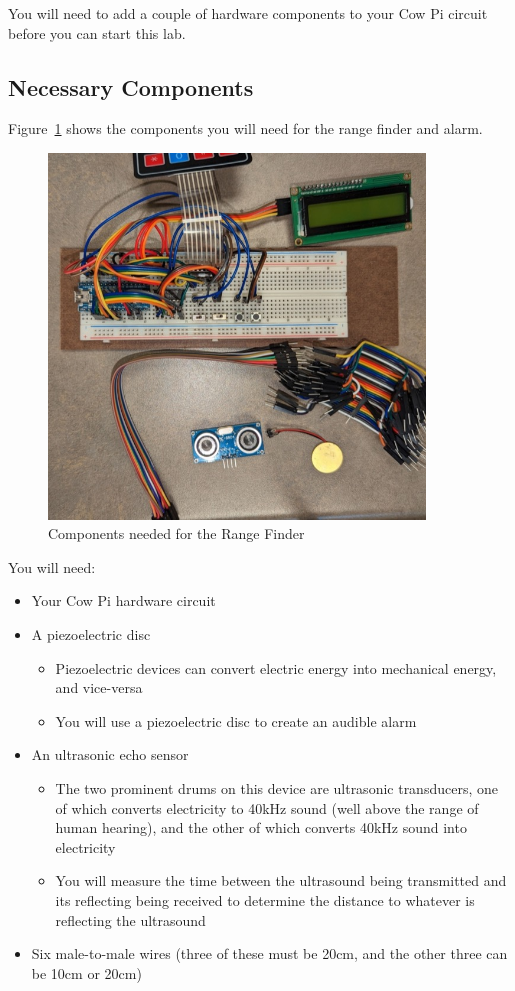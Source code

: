 You will need to add a couple of hardware components to your Cow Pi circuit before you can start this lab.

\subsection{Necessary Components}

Figure~\ref{fig:components-mk1f} shows the components you will need for the range finder and alarm.

\begin{figure}
    \centering
    \includegraphics[width=10cm]{hardware/mk1f/components}
    \caption{Components needed for the Range Finder \label{fig:components-mk1f}}
\end{figure}

You will need:
\begin{itemize}
    \item Your Cow Pi hardware circuit
    \item A piezoelectric disc
        \begin{itemize}
            \item Piezoelectric devices can convert electric energy into mechanical energy, and vice-versa
            \item You will use a piezoelectric disc to create an audible alarm
        \end{itemize}
    \item An ultrasonic echo sensor
        \begin{itemize}
            \item The two prominent drums on this device are ultrasonic transducers, one of which converts electricity to 40kHz sound (well above the range of human hearing), and the other of which converts 40kHz sound into electricity
            \item You will measure the time between the ultrasound being transmitted and its reflecting being received to determine the distance to whatever is reflecting the ultrasound
        \end{itemize}
    \item Six male-to-male wires (three of these must be 20cm, and the other three can be 10cm or 20cm)
\end{itemize}


